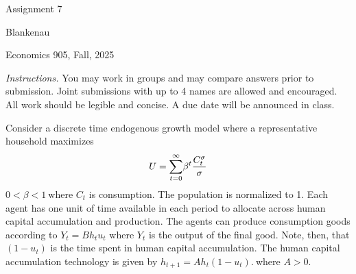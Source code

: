 \documentclass[12pt]{article}
\begin{document}
\begin{center}
{\LARGE Assignment 7}
\end{center}

\noindent Blankenau

\noindent Economics 905, Fall, 2025

\medskip
\noindent \noindent \textit{Instructions.} You may work in groups and may
compare answers prior to submission. Joint submissions with up to 4 names
are allowed and encouraged. All work should be legible and concise. A due
date will be announced in class.

\medskip Consider a discrete time endogenous growth model where a
representative household maximizes%
\begin{equation*}
U=\overset{\infty }{\underset{t=0}{\sum }}\beta ^{t}\frac{C_{t}^{\sigma }}{%
\sigma }
\end{equation*}%
$0<\beta <1\ $where $C_{t}$ is consumption. The population is normalized to
1. Each agent has one unit of time available in each period to allocate
across human capital accumulation and production. The agents can produce
consumption goods according to $Y_{t}=Bh_{t}u_{t}$ where $Y_{t}$ is the
output of the final good$.$ Note, then, that $\left( 1-u_{t}\right) $ is the
time spent in human capital accumulation. The human capital accumulation
technology is given by $h_{t+1}=Ah_{t}\left( 1-u_{t}\right) .\ $where $A>0.$
\end{document}
